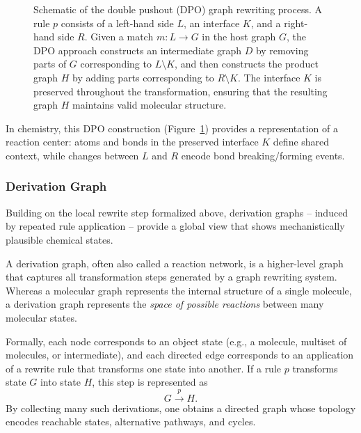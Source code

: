 \begin{figure}[H]
    \centering
    \caption[Double pushout graph rewriting]{
        Schematic of the double pushout (DPO) graph rewriting process. 
        A rule \(p\) consists of a left-hand side \(L\), an interface \(K\), and a right-hand side \(R\). 
        Given a match \(m: L \to G\) in the host graph \(G\), the DPO approach constructs an intermediate graph \(D\) by removing parts of \(G\) corresponding to \(L \setminus K\), and then constructs the product graph \(H\) by adding parts corresponding to \(R \setminus K\). 
        The interface \(K\) is preserved throughout the transformation, ensuring that the resulting graph \(H\) maintains valid molecular structure.
    }
    \label{fig:dpo-rewriting}
\end{figure}


In chemistry, this DPO construction (Figure~\ref{fig:dpo-rewriting}) provides a representation of a reaction center: atoms and bonds in the preserved interface \(K\) define shared context, while changes between \(L\) and \(R\) encode bond breaking/forming events. \cite[p.~5]{Andersen2017}

\subsubsection{Derivation Graph}
Building on the local rewrite step formalized above, derivation graphs -- induced by repeated rule application -- provide a global view that shows mechanistically plausible chemical states.
\cite[pp.~2--3]{Andersen2013}

A derivation graph, often also called a reaction network, is a higher-level graph that captures all transformation steps generated by a graph rewriting system. 
\cite[Sec.~10]{MODDocDGStrat} \cite[p.~2]{Abel2026}
Whereas a molecular graph represents the internal structure of a single molecule, a derivation graph represents the \emph{space of possible reactions} between many molecular states. 
\cite[pp.~2--3]{Andersen2013}

Formally, each node corresponds to an object state (e.g., a molecule, multiset of molecules, or intermediate), and each directed edge corresponds to an application of a rewrite rule that transforms one state into another. 
 \cite[p.~75]{Echahed2016}
If a rule $p$ transforms state $G$ into state $H$, this step is represented as
\[
G \stackrel{p}{\longrightarrow} H.
\]
By collecting many such derivations, one obtains a directed graph whose topology encodes reachable states, alternative pathways, and cycles.  

